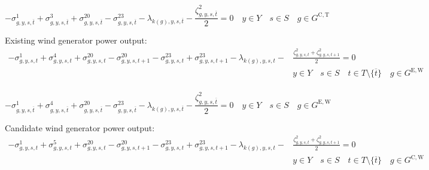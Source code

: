 \documentclass{article}
\newcommand{\sGeneratorsExistingWind}{G^{\mathrm{E,W}}}
\newcommand{\sGeneratorsCandidateThermal}{G^{\mathrm{C,T}}}
\newcommand{\sGeneratorsCandidateWind}{G^{\mathrm{C,W}}}
\newcommand{\sYears}{Y}
\newcommand{\sScenarios}{S}
\newcommand{\sIntervals}{T}
\newcommand{\iGenerator}{g}
\newcommand{\iYear}{y}
\newcommand{\iScenario}{s}
\newcommand{\iInterval}{t}
\newcommand{\iIntervalTerminal}{\overline{\iInterval}}
\newcommand{\iZone}{z}
\newcommand{\dMinPowerOutput}[1][\iGenerator,\iYear,\iScenario,\iInterval]{\sigma_{#1}^{1}}
\newcommand{\dMaxPowerOutputCandidateThermal}[1][\iGenerator,\iYear,\iScenario,\iInterval]{\sigma_{#1}^{3}}
\newcommand{\dMaxPowerOutputWindExisting}[1][\iGenerator,\iYear,\iScenario,\iInterval]{\sigma_{#1}^{4}}
\newcommand{\dMaxPowerOutputWindCandidate}[1][\iGenerator,\iYear,\iScenario,\iInterval]{\sigma_{#1}^{5}}
\newcommand{\dRampRateUp}[1][\iGenerator,\iYear,\iScenario,\iInterval]{\sigma_{#1}^{20}}
\newcommand{\dRampRateDown}[1][\iGenerator,\iYear,\iScenario,\iInterval]{\sigma_{#1}^{23}}
\newcommand{\dPowerBalance}[1][\iZone,\iYear,\iScenario,\iInterval]{\lambda_{#1}}
\newcommand{\dGeneratorEnergyOutput}[1][\iGenerator,\iYear,\iScenario,\iInterval]{\zeta_{#1}^{2}}
\begin{document}
\begin{equation}
-\dMinPowerOutput[\iGenerator,\iYear,\iScenario,\iIntervalTerminal] + \dMaxPowerOutputCandidateThermal[\iGenerator,\iYear,\iScenario,\iIntervalTerminal] + \dRampRateUp[\iGenerator,\iYear,\iScenario,\iIntervalTerminal] - \dRampRateDown[\iGenerator,\iYear,\iScenario,\iIntervalTerminal] - \dPowerBalance[k(\iGenerator),\iYear,\iScenario,\iIntervalTerminal] - \frac{\dGeneratorEnergyOutput[\iGenerator,\iYear,\iScenario,\iIntervalTerminal]}{2} = 0 \quad \iYear \in \sYears \quad \iScenario \in \sScenarios \quad \iGenerator \in \sGeneratorsCandidateThermal
\end{equation}

Existing wind generator power output:
\begin{align}
-\dMinPowerOutput + \dMaxPowerOutputWindExisting + \dRampRateUp - \dRampRateUp[\iGenerator,\iYear,\iScenario,\iInterval+1] - \dRampRateDown + \dRampRateDown[\iGenerator,\iYear,\iScenario,\iInterval+1] - \dPowerBalance[k(\iGenerator),\iYear,\iScenario,\iInterval] - & \frac{\dGeneratorEnergyOutput + \dGeneratorEnergyOutput[\iGenerator,\iYear,\iScenario,\iInterval+1]}{2} = 0 \\\nonumber
& \iYear \in \sYears \quad \iScenario \in \sScenarios \quad \iInterval \in \sIntervals \setminus \{\iIntervalTerminal\} \quad \iGenerator \in \sGeneratorsExistingWind\\\nonumber
\end{align}

\begin{equation}
 -\dMinPowerOutput[\iGenerator,\iYear,\iScenario,\iIntervalTerminal] + \dMaxPowerOutputWindExisting[\iGenerator,\iYear,\iScenario,\iIntervalTerminal] + \dRampRateUp[\iGenerator,\iYear,\iScenario,\iIntervalTerminal] - \dRampRateDown[\iGenerator,\iYear,\iScenario,\iIntervalTerminal] - \dPowerBalance[k(\iGenerator),\iYear,\iScenario,\iIntervalTerminal] - \frac{\dGeneratorEnergyOutput[\iGenerator,\iYear,\iScenario,\iIntervalTerminal]}{2} = 0 \quad \iYear \in \sYears \quad \iScenario \in \sScenarios \quad \iGenerator \in \sGeneratorsExistingWind
\end{equation}

Candidate wind generator power output:
\begin{align}
-\dMinPowerOutput + \dMaxPowerOutputWindCandidate + \dRampRateUp - \dRampRateUp[\iGenerator,\iYear,\iScenario,\iInterval+1] - \dRampRateDown + \dRampRateDown[\iGenerator,\iYear,\iScenario,\iInterval+1] - \dPowerBalance[k(\iGenerator),\iYear,\iScenario,\iInterval] - & \frac{\dGeneratorEnergyOutput + \dGeneratorEnergyOutput[\iGenerator,\iYear,\iScenario,\iInterval+1]}{2} = 0 \\\nonumber
& \iYear \in \sYears \quad \iScenario \in \sScenarios \quad \iInterval \in \sIntervals \setminus \{\iIntervalTerminal\} \quad \iGenerator \in \sGeneratorsCandidateWind\\\nonumber
\end{align}
\end{document}
